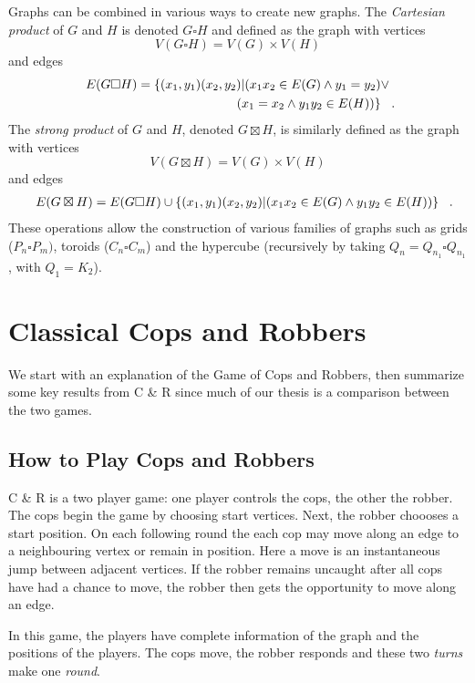 Graphs can be combined in various ways to create new graphs.
The \textit{Cartesian product} of $G$ and $H$ is denoted $G \square H$ and defined as the graph with vertices
\[ V(G \square H) = V(G) \times V(H) \]
and edges
\begin{align*}
  E(G \square H) = \{ (x_1,y_1)(x_2,y_2) | (x_1x_2 \in E(G) \land y_1 = y_2) &\lor \\
  (x_1 = x_2 \land y_1y_2 \in E(H)) \} \mperiod
\end{align*}
The \textit{strong product} of $G$ and $H$, denoted $G \boxtimes H$, is similarly defined as the graph with vertices
\[ V(G \boxtimes H) = V(G) \times V(H) \]
and edges
\begin{align*}
  E(G \boxtimes H) = E(G \square H) \cup \{ (x_1,y_1)(x_2,y_2) | (x_1x_2 \in E(G) \land y_1y_2 \in E(H)) \} \mperiod
\end{align*}
These operations allow the construction of various families of graphs such as grids ($P_n \square P_m)$, toroids ($C_n \square C_m$) and the hypercube (recursively by taking $Q_n = Q_{n_1} \square Q_{n_1}$, with $Q_1 = K_2$).

\section{Classical Cops and Robbers}

We start with an explanation of the Game of Cops and Robbers, then summarize some key results from C \& R since much of our thesis is a comparison between the two games.

\subsection{How to Play Cops and Robbers}

C \& R is a two player game: one player controls the cops, the other the robber.
The cops begin the game by choosing start vertices. Next, the robber choooses a start position.
On each following round the each cop may move along an edge to a neighbouring vertex
or remain in position.
Here a move is an instantaneous jump between adjacent vertices.
If the robber remains uncaught after all cops have had a chance to move, the
robber then gets the opportunity to move along an edge.

In this game, the players have complete information of the graph and the positions of the players.
The cops move, the robber responds and these two \textit{turns} make one \textit{round}.

